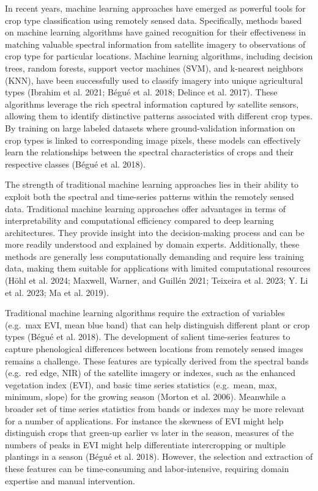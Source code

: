 \documentclass[
  journal,
  twocolumn]{IEEEtran}
\begin{document}
In recent years, machine learning approaches have emerged as powerful
tools for crop type classification using remotely sensed data.
Specifically, methods based on machine learning algorithms have gained
recognition for their effectiveness in matching valuable spectral
information from satellite imagery to observations of crop type for
particular locations. Machine learning algorithms, including decision
trees, random forests, support vector machines (SVM), and k-nearest
neighbors (KNN), have been successfully used to classify imagery into
unique agricultural types (Ibrahim et al. 2021; Bégué et al. 2018;
Delince et al. 2017). These algorithms leverage the rich spectral
information captured by satellite sensors, allowing them to identify
distinctive patterns associated with different crop types. By training
on large labeled datasets where ground-validation information on crop
types is linked to corresponding image pixels, these models can
effectively learn the relationships between the spectral characteristics
of crops and their respective classes (Bégué et al. 2018).

The strength of traditional machine learning approaches lies in their
ability to exploit both the spectral and time-series patterns within the
remotely sensed data. Traditional machine learning approaches offer
advantages in terms of interpretability and computational efficiency
compared to deep learning architectures. They provide insight into the
decision-making process and can be more readily understood and explained
by domain experts. Additionally, these methods are generally less
computationally demanding and require less training data, making them
suitable for applications with limited computational resources (Höhl et
al. 2024; Maxwell, Warner, and Guillén 2021; Teixeira et al. 2023; Y. Li
et al. 2023; Ma et al. 2019).

Traditional machine learning algorithms require the extraction of
variables (e.g.~max EVI, mean blue band) that can help distinguish
different plant or crop types (Bégué et al. 2018). The development of
salient time-series features to capture phenological differences between
locations from remotely sensed images remains a challenge. These
features are typically derived from the spectral bands (e.g.~red edge,
NIR) of the satellite imagery or indexes, such as the enhanced
vegetation index (EVI), and basic time series statistics (e.g.~mean,
max, minimum, slope) for the growing season (Morton et al. 2006).
Meanwhile a broader set of time series statistics from bands or indexes
may be more relevant for a number of applications. For instance the
skewness of EVI might help distinguish crops that green-up earlier vs
later in the season, measures of the numbers of peaks in EVI might help
differentiate intercropping or multiple plantings in a season (Bégué et
al. 2018). However, the selection and extraction of these features can
be time-consuming and labor-intensive, requiring domain expertise and
manual intervention.
\end{document}
